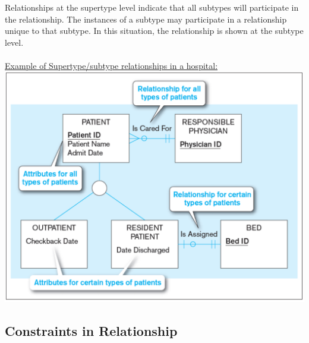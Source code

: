 \documentclass[12pt]{article}
\begin{document}
Relationships at the supertype level indicate that all subtypes will participate in the relationship. The instances of a subtype may participate in a relationship unique to that subtype. In this situation, the relationship is shown at the subtype level.\\
\\
\underline{Example of Supertype/subtype relationships in a hospital:}\\
\includegraphics[scale=0.5]{lec3-5}

\subsection{Constraints in Relationship}
\end{document}
